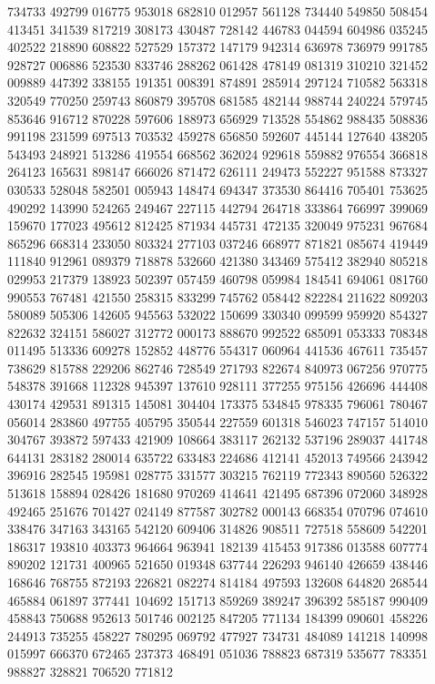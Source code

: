 {734733 492799 016775 953018 682810 012957 561128 734440 549850 508454 413451%
341539 817219 308173 430487 728142 446783 044594 604986 035245 402522 218890%
608822 527529 157372 147179 942314 636978 736979 991785 928727 006886 523530%
833746 288262 061428 478149 081319 310210 321452 009889 447392 338155 191351%
008391 874891 285914 297124 710582 563318 320549 770250 259743 860879 395708%
681585 482144 988744 240224 579745 853646 916712 870228 597606 188973 656929%
713528 554862 988435 508836 991198 231599 697513 703532 459278 656850 592607%
445144 127640 438205 543493 248921 513286 419554 668562 362024 929618 559882%
976554 366818 264123 165631 898147 666026 871472 626111 249473 552227 951588%
873327 030533 528048 582501 005943 148474 694347 373530 864416 705401 753625%
490292 143990 524265 249467 227115 442794 264718 333864 766997 399069 159670%
177023 495612 812425 871934 445731 472135 320049 975231 967684 865296 668314%
233050 803324 277103 037246 668977 871821 085674 419449 111840 912961 089379%
718878 532660 421380 343469 575412 382940 805218 029953 217379 138923 502397%
057459 460798 059984 184541 694061 081760 990553 767481 421550 258315 833299%
745762 058442 822284 211622 809203 580089 505306 142605 945563 532022 150699%
330340 099599 959920 854327 822632 324151 586027 312772 000173 888670 992522%
685091 053333 708348 011495 513336 609278 152852 448776 554317 060964 441536%
467611 735457 738629 815788 229206 862746 728549 271793 822674 840973 067256%
970775 548378 391668 112328 945397 137610 928111 377255 975156 426696 444408%
430174 429531 891315 145081 304404 173375 534845 978335 796061 780467 056014%
283860 497755 405795 350544 227559 601318 546023 747157 514010 304767 393872%
597433 421909 108664 383117 262132 537196 289037 441748 644131 283182 280014%
635722 633483 224686 412141 452013 749566 243942 396916 282545 195981 028775%
331577 303215 762119 772343 890560 526322 513618 158894 028426 181680 970269%
414641 421495 687396 072060 348928 492465 251676 701427 024149 877587 302782%
000143 668354 070796 074610 338476 347163 343165 542120 609406 314826 908511%
727518 558609 542201 186317 193810 403373 964664 963941 182139 415453 917386%
013588 607774 890202 121731 400965 521650 019348 637744 226293 946140 426659%
438446 168646 768755 872193 226821 082274 814184 497593 132608 644820 268544%
465884 061897 377441 104692 151713 859269 389247 396392 585187 990409 458843%
750688 952613 501746 002125 847205 771134 184399 090601 458226 244913 735255%
458227 780295 069792 477927 734731 484089 141218 140998 015997 666370 672465%
237373 468491 051036 788823 687319 535677 783351 988827 328821 706520 771812%
}
